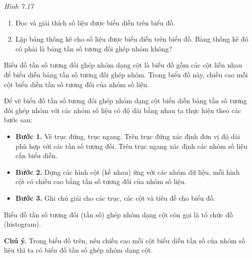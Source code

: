 \begin{lesson}
\begin{center}

        \textit{Hình 7.17}
    \end{center}

    \begin{enumerate}[label=\alph*)]
        \item Đọc và giải thích số liệu được biểu diễn trên biểu đồ.

        \answerline
        \answerline

        \item Lập bảng thống kê cho số liệu được biểu diễn trên biểu đồ. Bảng thống kê đó có phải là bảng tần số tương đối ghép nhóm không?

        \answerline
        \answerline
        \answerline
    \end{enumerate}

    \begin{keyconcept}
        Biểu đồ tần số tương đối ghép nhóm dạng cột là biểu đồ gồm các cột liền nhau để biểu diễn bảng tần số tương đối ghép nhóm. Trong biểu đồ này, chiều cao mỗi cột biểu diễn tần số tương đối của nhóm số liệu.
    \end{keyconcept}

    Để vẽ biểu đồ tần số tương đối ghép nhóm dạng cột biểu diễn bảng tần số tương đối ghép nhóm với các nhóm số liệu có độ dài bằng nhau ta thực hiện theo các bước sau:

    \begin{itemize}
        \item \textbf{Bước 1.} Vẽ trục đứng, trục ngang. Trên trục đứng xác định đơn vị độ dài phù hợp với các tần số tương đối. Trên trục ngang xác định các nhóm số liệu cần biểu diễn.
        \item \textbf{Bước 2.} Dựng các hình cột (kề nhau) ứng với các nhóm dữ liệu, mỗi hình cột có chiều cao bằng tần số tương đối của nhóm số liệu.
        \item \textbf{Bước 3.} Ghi chú giải cho các trục, các cột và tiêu đề cho biểu đồ.
    \end{itemize}

    Biểu đồ tần số tương đối (tần số) ghép nhóm dạng cột còn gọi là tổ chức đồ (histogram).

    \textbf{Chú ý.} Trong biểu đồ trên, nếu chiều cao mỗi cột biểu diễn tần số của nhóm số liệu thì ta có biểu đồ tần số ghép nhóm dạng cột.


\end{lesson}
